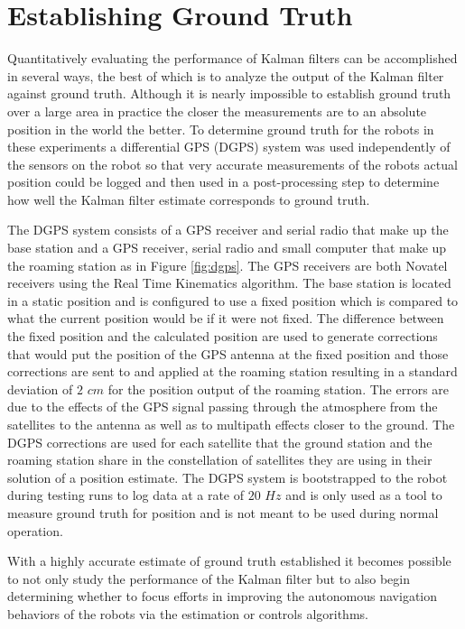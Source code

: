 \section{Establishing Ground Truth}
\label{sec:groundtruth}
Quantitatively evaluating the performance of Kalman filters can be accomplished in several ways, the best of which is to analyze the output of the Kalman filter against ground truth. Although it is nearly impossible to establish ground truth over a large area in practice the closer the measurements are to an absolute position in the world the better. To determine ground truth for the robots in these experiments a differential GPS (DGPS) system was used independently of the sensors on the robot so that very accurate measurements of the robots actual position could be logged and then used in a post-processing step to determine how well the Kalman filter estimate corresponds to ground truth.

The DGPS system consists of a GPS receiver and serial radio that make up the base station and a GPS receiver, serial radio and small computer that make up the roaming station as in Figure \ref{fig:dgps}. The GPS receivers are both Novatel receivers using the Real Time Kinematics algorithm. The base station is located in a static position and is configured to use a fixed position which is compared to what the current position would be if it were not fixed. The difference between the fixed position and the calculated position are used to generate corrections that would put the position of the GPS antenna at the fixed position and those corrections are sent to and applied at the roaming station resulting in a standard deviation of $2$ $cm$ for the position output of the roaming station. The errors are due to the effects of the GPS signal passing through the atmosphere from the satellites to the antenna as well as to multipath effects closer to the ground. The DGPS corrections are used for each satellite that the ground station and the roaming station share in the constellation of satellites they are using in their solution of a position estimate. The DGPS system is bootstrapped to the robot during testing runs to log data at a rate of $20$ $Hz$ and is only used as a tool to measure ground truth for position and is not meant to be used during normal operation.

With a highly accurate estimate of ground truth established it becomes possible to not only study the performance of the Kalman filter but to also begin determining whether to focus efforts in improving the autonomous navigation behaviors of the robots via the estimation or controls algorithms.

